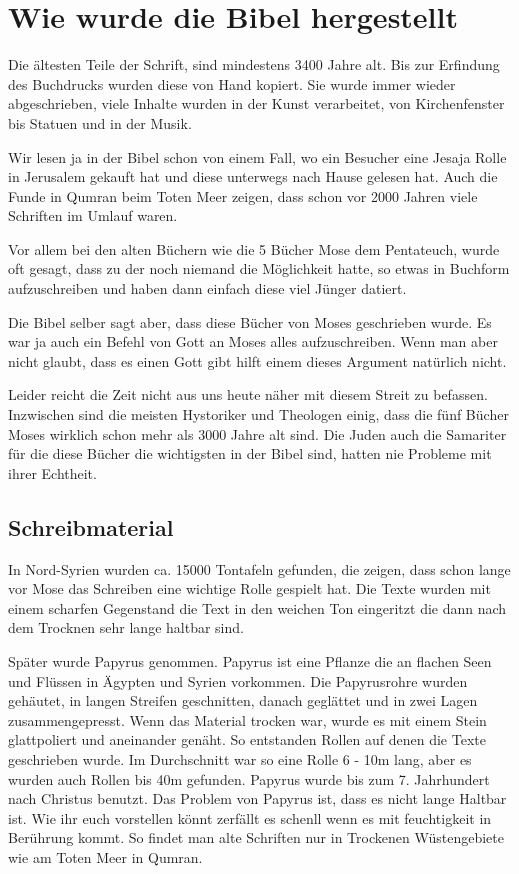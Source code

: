\section{Wie wurde die Bibel hergestellt}

Die ältesten Teile der Schrift, sind mindestens 3400 Jahre alt. Bis zur Erfindung des Buchdrucks wurden diese von Hand kopiert. Sie wurde immer wieder abgeschrieben, viele Inhalte wurden in der Kunst verarbeitet, von Kirchenfenster bis Statuen und in der Musik.

Wir lesen ja in der Bibel schon von einem Fall, wo ein Besucher eine Jesaja Rolle in Jerusalem gekauft hat und diese unterwegs nach Hause gelesen hat. Auch die Funde in Qumran beim Toten Meer zeigen, dass schon vor 2000 Jahren viele Schriften im Umlauf waren.

Vor allem bei den alten Büchern wie die 5 Bücher Mose dem Pentateuch, wurde oft gesagt, dass zu der noch niemand die Möglichkeit hatte, so etwas in Buchform aufzuschreiben und haben dann einfach diese viel Jünger datiert.

Die Bibel selber sagt aber, dass diese Bücher von Moses geschrieben wurde. Es war ja auch ein Befehl von Gott an Moses alles aufzuschreiben. Wenn man aber nicht glaubt, dass es einen Gott gibt hilft einem dieses Argument natürlich nicht.

Leider reicht die Zeit nicht aus uns heute näher mit diesem Streit zu befassen. Inzwischen sind die meisten Hystoriker und Theologen einig, dass die fünf Bücher Moses wirklich schon mehr als 3000 Jahre alt sind. Die Juden auch die Samariter für die diese Bücher die wichtigsten in der Bibel sind, hatten nie Probleme mit ihrer Echtheit.

\subsection{Schreibmaterial}
In Nord-Syrien wurden ca. 15000 Tontafeln gefunden, die zeigen, dass schon lange vor Mose das Schreiben eine wichtige Rolle gespielt hat. Die Texte wurden mit einem scharfen Gegenstand die Text in den weichen Ton eingeritzt die dann nach dem Trocknen sehr lange haltbar sind.

Später wurde Papyrus genommen. Papyrus ist eine Pflanze die an flachen Seen und Flüssen in Ägypten und Syrien vorkommen. Die Papyrusrohre wurden gehäutet, in langen Streifen geschnitten, danach geglättet und in zwei Lagen zusammengepresst. Wenn das Material trocken war, wurde es mit einem Stein glattpoliert und aneinander genäht. So entstanden Rollen auf denen die Texte geschrieben wurde. Im Durchschnitt war so eine Rolle 6 - 10m lang, aber es wurden auch Rollen bis 40m gefunden. Papyrus wurde bis zum 7. Jahrhundert nach Christus benutzt. Das Problem von Papyrus ist, dass es nicht lange Haltbar ist. Wie ihr euch vorstellen könnt zerfällt es schenll wenn es mit feuchtigkeit in Berührung kommt. So findet man alte Schriften nur in Trockenen Wüstengebiete wie \zB{} am Toten Meer in Qumran.


